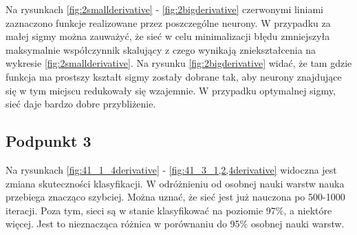 \documentclass[a4paper, portrait,11pt]{article}
\begin{document}
Na rysunkach \ref{fig:2smallderivative} - \ref{fig:2bigderivative} czerwonymi liniami zaznaczono funkcje realizowane przez poszczególne neurony.
W przypadku za małej sigmy można zauważyć, że sieć w celu minimalizacji błędu zmniejszyła maksymalnie współczynnik skalujący z czego wynikają zniekształcenia na wykresie \ref{fig:2smallderivative}.
Na rysunku \ref{fig:2bigderivative} widać, że tam gdzie funkcja ma prostszy kształt sigmy zostały dobrane tak, aby neurony znajdujące się w tym miejscu redukowały się wzajemnie.
W przypadku optymalnej sigmy, sieć daje bardzo dobre przybliżenie.

\subsection{Podpunkt 3}

Na rysunkach \ref{fig:41_1_4derivative} - \ref{fig:41_3_1,2,4derivative} widoczna jest zmiana skuteczności klasyfikacji.
W odróżnieniu od osobnej nauki warstw nauka przebiega znacząco szybciej. Można uznać, że sieć jest już nauczona po 500-1000 iteracji.
Poza tym, sieci są w stanie klasyfikować na poziomie 97\%, a niektóre więcej. Jest to nieznacząca różnica w porównaniu do 95\% osobnej nauki warstw.
\end{document}
